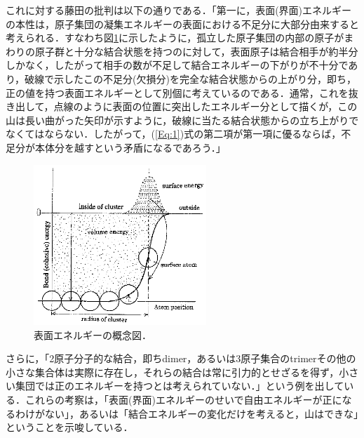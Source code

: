 \documentclass[a4j,10pt]{jarticle}
\begin{document}
これに対する藤田の批判は以下の通りである\cite{Fujita:2003}．「第一に，表面(界面)エネルギーの本性は，原子集団の凝集エネルギーの表面における不足分に大部分由来すると考えられる．すなわち図\ref{SurfaceEnergy}に示したように，孤立した原子集団の内部の原子がまわりの原子群と十分な結合状態を持つのに対して，表面原子は結合相手が約半分しかなく，したがって相手の数が不足して結合エネルギーの下がりが不十分であり，破線で示したこの不足分(欠損分)を完全な結合状態からの上がり分，即ち，正の値を持つ表面エネルギーとして別個に考えているのである．通常，これを抜き出して，点線のように表面の位置に突出したエネルギー分として描くが，この山は長い曲がった矢印が示すように，破線に当たる結合状態からの立ち上がりでなくてはならない．したがって，(\ref{Eq:1})式の第二項が第一項に優るならば，不足分が本体分を越すという矛盾になるであろう．」
\begin{figure}[ht]\begin{center}
\includegraphics[width=65mm]{./figs/SurfaceEnergy.eps}
\caption{表面エネルギーの概念図．}
\label{SurfaceEnergy}
\end{center}\end{figure}

さらに，「2原子分子的な結合，即ちdimer，あるいは3原子集合のtrimerその他の小さな集合体は実際に存在し，それらの結合は常に引力的とせざるを得ず，小さい集団では正のエネルギーを持つとは考えられていない．」という例を出している．これらの考察は，「表面(界面)エネルギーのせいで自由エネルギーが正になるわけがない」，あるいは「結合エネルギーの変化だけを考えると，山はできな」ということを示唆している．
\end{document}
